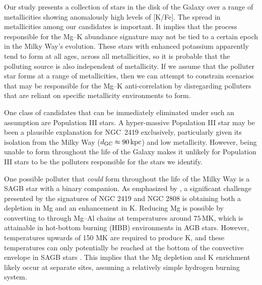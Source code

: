 \documentclass[a4paper,fleqn,usenatbib]{mnras}
\begin{document}
Our study presents a collection of stars in the disk of the Galaxy over a range of metallicities showing anomalously high levels of [K/Fe]. The spread in metallicities among our candidates is important. It implies that the process responsible for the Mg--K abundance signature may not be tied to a certain epoch in the Milky Way's evolution. These stars with enhanced potassium apparently tend to form at all ages, across all metallicities, so it is probable that the polluting source is also independent of metallicity. If we assume that the polluter star forms at a range of metallicities, then we can attempt to constrain scenarios that may be responsible for the Mg--K anti-correlation by disregarding polluters that are reliant on specific metallicity environments to form.

One class of candidates that can be immediately eliminated under such an assumption are Population III stars. A hyper-massive Population III star may be been a plausible explanation for NGC~2419 \citep{carretta2013} exclusively, particularly given its isolation from the Milky Way ($d_{\rm GC} \approx 90\,{\rm kpc}$) and low metallicity. However, being unable to form throughout the life of the Galaxy makes it unlikely for Population III stars to be the polluters responsible for the stars we identify.

One possible polluter that \textit{could} form throughout the life of the Milky Way is a SAGB star with a binary companion. As emphasized by \cite{prantzos2017}, a significant challenge presented by the signatures of NGC 2419 and NGC 2808 is obtaining both a depletion in Mg and an enhancement in K. Reducing Mg is possible by converting  to  through Mg--Al chains at temperatures around $75\,$MK, which is attainable in hot-bottom burning (HBB) environments in AGB stars. However, temperatures upwards of 150 MK are required to produce K, and these temperatures can only potentially be reached at the bottom of the convective envelope in SAGB stars \citep{iliadis2016}. This implies that the Mg depletion and K enrichment likely occur at separate sites, assuming a relatively simple hydrogen burning system. 
\end{document}
